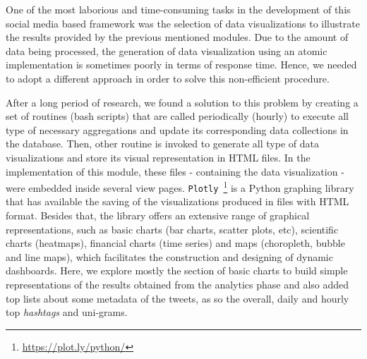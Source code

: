 One of the most laborious and time-consuming tasks in the development of this social media based framework was the selection of data visualizations to illustrate the results provided by the previous mentioned modules. Due to the amount of data being processed, the generation of data visualization using an atomic implementation is sometimes poorly in terms of response time. Hence, we needed to adopt a different approach in order to solve this non-efficient procedure.

After a long period of research, we found a solution to this problem by creating a set of routines (bash scripts) that are called periodically (hourly) to execute all type of necessary aggregations and update its corresponding data collections in the database. Then, other routine is invoked to generate all type of data visualizations and store its visual representation in HTML files. In the implementation of this module, these files - containing the data visualization - were embedded inside several view pages. \texttt{Plotly}~\footnote{\url{https://plot.ly/python/}} is a Python graphing library that has available the saving of the visualizations produced in files with HTML format. Besides that, the library offers an extensive range of graphical representations, such as basic charts (bar charts, scatter plots, etc), scientific charts (heatmaps), financial charts (time series) and maps (choropleth, bubble and line maps), which facilitates the construction and designing of dynamic dashboards. Here, we explore mostly the section of basic charts to build simple representations of the results obtained from the analytics phase and also added top lists about some metadata of the tweets, as so the overall, daily and hourly top \textit{hashtags} and uni-grams.

